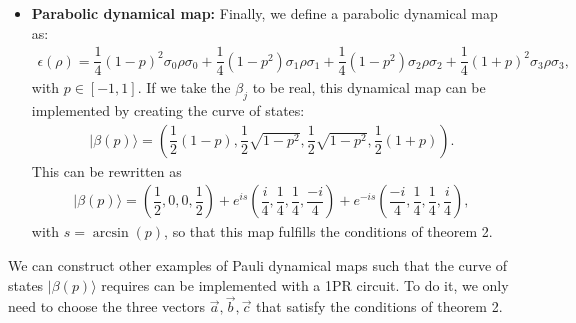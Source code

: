 \documentclass[10pt,letterpaper]{article} %
\begin{document}
\begin{itemize}
\item \textbf{Parabolic dynamical map:} Finally, we define a parabolic dynamical map as:
\begin{eqnarray}
\epsilon(\rho) = \dfrac{1}{4} (1-p)^2 \sigma_0 \rho \sigma_0 + \dfrac{1}{4} (1-p^2) \sigma_1 \rho \sigma_1 + \dfrac{1}{4} (1-p^2) \sigma_2 \rho \sigma_2 + \dfrac{1}{4} (1+p)^2 \sigma_3 \rho \sigma_3 ,
\end{eqnarray}
with $p \in [-1,1]$. 
If we take the $\beta_j$ to be real,
this dynamical map can be implemented
by creating the curve of states:
\begin{eqnarray}
|\beta(p)\rangle = \left(\dfrac{1}{2} (1-p) , \dfrac{1}{2} \sqrt{1-p^2} , \dfrac{1}{2} \sqrt{1-p^2} , \dfrac{1}{2}(1+p) \right).
\end{eqnarray}
This can be rewritten as
\begin{align*}
|\beta(p)\rangle = \left( \dfrac{1}{2},0,0, \dfrac{1}{2} \right) + e^{is} \left( \dfrac{i}{4}, \dfrac{1}{4}, \dfrac{1}{4}, \dfrac{-i}{4} \right) + e^{-is}  \left( \dfrac{-i}{4}, \dfrac{1}{4}, \dfrac{1}{4}, \dfrac{i}{4} \right),
\end{align*}
with $s = \arcsin(p)$, so that
this map fulfills the conditions of theorem 2.
\end{itemize}

We can construct other examples of 
Pauli dynamical maps
such that the curve of states $|\beta(p)\rangle$ requires
can be implemented with a 1PR circuit.
To do it, we only need to choose the three vectors $\vec{a}, \vec{b},\vec{c}$
that satisfy the conditions of theorem 2.
\end{document}
